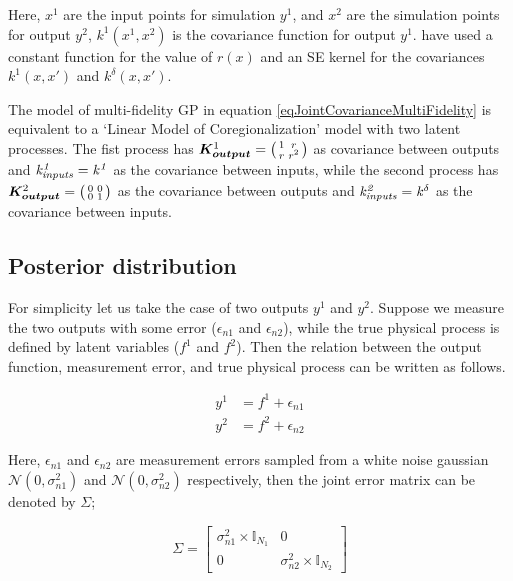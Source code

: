 Here, $x^{1}$ are the input points for simulation $y^{1}$, and $x^{2}$ are the simulation points for output $y^{2}$, $k^{1}(x^{1}, x^{2})$ is the covariance function for output $y^{1}$. \cite{kennedy2000predicting} have used a constant function for the value of $r(x)$ and an SE kernel for the covariances $k^{1}(x, x')$ and $k^{\delta}(x, x')$. 

The model of multi-fidelity GP in equation \ref{eqJointCovarianceMultiFidelity} is equivalent to a `Linear Model of Coregionalization' model with two latent processes. The fist process has $\boldsymbol{K_{output}}^{1} = \bigl( \begin{smallmatrix} 1 & r\\ r & r^2\end{smallmatrix}\bigr)$ as covariance between outputs and $\mathit{k_{inputs}^1 = k^1}$ as the covariance between inputs, while the second process has $\boldsymbol{K_{output}}^{2} = \bigl( \begin{smallmatrix} 0 & 0\\ 0 & 1\end{smallmatrix}\bigr)$ as the covariance between outputs and $\mathit{k_{inputs}^2 = k^\delta}$ as the covariance between inputs. 

\subsection{Posterior distribution}\label{subsecPosteriorDistribution}
For simplicity let us take the case of two outputs \(y^{1}\) and \(y^{2}\). Suppose we measure the two outputs with some error ($\epsilon_{n1}$ and $\epsilon_{n2}$), while the true physical process is defined by latent variables (\(f^{1}\) and \(f^{2}\)). Then the relation between the output function, measurement error, and true physical process can be written as follows. 

\begin{align} \label{eq:relationOutputLatent}
y^{1} & = f^{1} + \epsilon_{n1} \\
y^{2} & = f^{2} + \epsilon_{n2}
\end{align} 

Here, \(\epsilon_{n1}\) and \(\epsilon_{n2}\) are measurement errors sampled from a white noise gaussian \(\mathcal{N}(0, \sigma_{n1}^2)\) and \(\mathcal{N}(0, \sigma_{n2}^2)\) respectively, then the joint error matrix can be denoted by \(\Sigma\);

\begin{equation}\label{eq:sigmaToError}
         \Sigma = 
          \begin{bmatrix}
          \sigma _{n1}^{2} \times \mathbb{I}_{N_{1}} & 0 \\ 
          0 & \sigma _{n2}^{2} \times \mathbb{I}_{N_{2}}
          \end{bmatrix} 
\end{equation}
         
